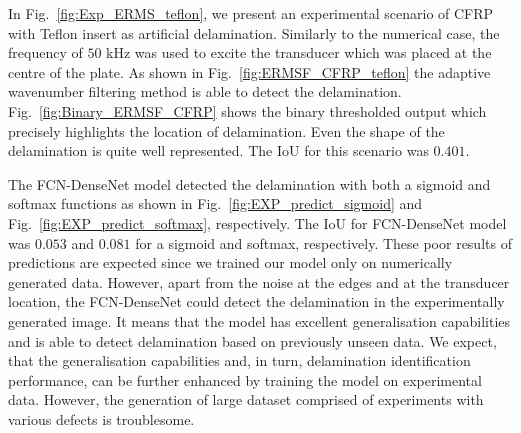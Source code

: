 In Fig.~\ref{fig:Exp_ERMS_teflon}, we present an experimental scenario of CFRP with Teflon insert as artificial delamination.
Similarly to the numerical case, the frequency of \(50\) kHz was used to excite the transducer which was placed at the centre of the plate.
As shown in Fig.~\ref{fig:ERMSF_CFRP_teflon} the adaptive wavenumber filtering method is able to detect the delamination. 
Fig.~\ref{fig:Binary_ERMSF_CFRP} shows the binary thresholded output which precisely highlights the location of delamination. 
Even the shape of the delamination is quite well represented.
The IoU for this scenario was \(0.401\). 

The FCN-DenseNet model detected the delamination with both a sigmoid and softmax functions as shown in Fig.~\ref{fig:EXP_predict_sigmoid} and Fig.~\ref{fig:EXP_predict_softmax}, respectively.
The IoU for FCN-DenseNet model was \(0.053\) and \(0.081\) for a sigmoid and softmax, respectively.
These poor results of predictions are expected since we trained our model only on numerically generated data.
However, apart from the noise at the edges and at the transducer location, the FCN-DenseNet could detect the delamination in the experimentally generated image.
It means that the model has excellent generalisation capabilities and is able to detect delamination based on previously unseen data.
We expect, that the generalisation capabilities and, in turn, delamination identification performance, can be further enhanced by training the model on experimental data.
However, the generation of large dataset comprised of experiments with various defects is troublesome.

